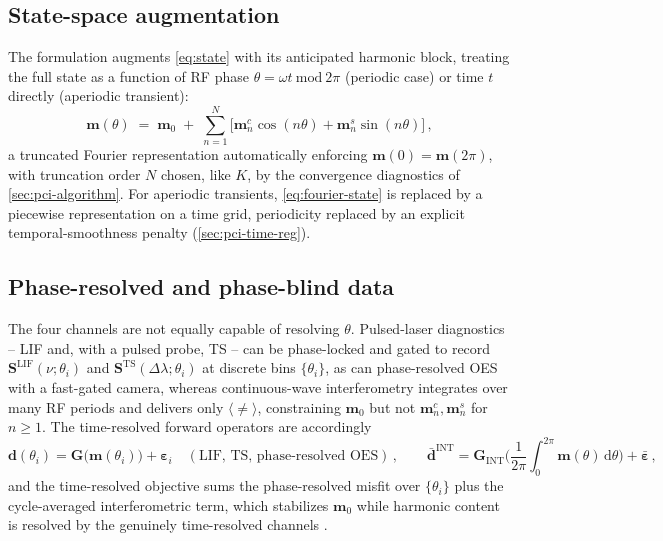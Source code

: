 \subsection{State-space augmentation}

The formulation augments \cref{eq:state} with its anticipated harmonic block, treating the full state as a function of RF phase $\theta=\omega t\ \mathrm{mod}\ 2\pi$ (periodic case) or time $t$ directly (aperiodic transient):
\begin{equation}
\mathbf m(\theta) \;=\; \mathbf m_{0} \;+\; \sum_{n=1}^{N} \Big[\mathbf m_{n}^{c}\cos(n\theta) + \mathbf m_{n}^{s}\sin(n\theta)\Big] \, , \label{eq:fourier-state}
\end{equation}
a truncated Fourier representation automatically enforcing $\mathbf m(0)=\mathbf m(2\pi)$, with truncation order $N$ chosen, like $K$, by the convergence diagnostics of \cref{sec:pci-algorithm}. For aperiodic transients, \cref{eq:fourier-state} is replaced by a piecewise representation on a time grid, periodicity replaced by an explicit temporal-smoothness penalty (\cref{sec:pci-time-reg}).

\subsection{Phase-resolved and phase-blind data}

The four channels are not equally capable of resolving $\theta$. Pulsed-laser diagnostics -- LIF and, with a pulsed probe, TS -- can be phase-locked and gated to record $\mathbf S^{\mathrm{LIF}}(\nu;\theta_{i})$ and $\mathbf S^{\mathrm{TS}}(\Delta\lambda;\theta_{i})$ at discrete bins $\{\theta_{i}\}$, as can phase-resolved OES with a fast-gated camera, whereas continuous-wave interferometry integrates over many RF periods and delivers only $\langle\ne\rangle$, constraining $\mathbf m_{0}$ but not $\mathbf m_{n}^{c},\mathbf m_{n}^{s}$ for $n\ge 1$. The time-resolved forward operators are accordingly
\begin{equation}
\mathbf d(\theta_{i}) = \mathbf G\big(\mathbf m(\theta_{i})\big) + \boldsymbol\varepsilon_{i}\quad (\text{LIF, TS, phase-resolved OES})\, ,\qquad \bar{\mathbf d}^{\mathrm{INT}} = \mathbf G_{\mathrm{INT}}\Big(\frac{1}{2\pi}\!\int_{0}^{2\pi}\!\mathbf m(\theta)\,\mathrm d\theta\Big) + \bar{\boldsymbol\varepsilon} \, , \label{eq:phase-forward}
\end{equation}
and the time-resolved objective sums the phase-resolved misfit over $\{\theta_{i}\}$ plus the cycle-averaged interferometric term, which stabilizes $\mathbf m_{0}$ while harmonic content is resolved by the genuinely time-resolved channels \cite{ref0043,ref0106}.

